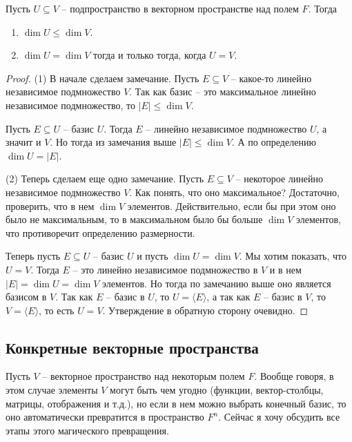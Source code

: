 \begin{claim}
\label{claim::DimSub}
Пусть $U\subseteq V$ -- подпространство в векторном пространстве над полем $F$.
Тогда
\begin{enumerate}
\item $\dim U \leqslant \dim V$.

\item $\dim U = \dim V$ тогда и только тогда, когда $U = V$.
\end{enumerate}
\end{claim}
\begin{proof}
(1) В начале сделаем замечание.
Пусть $E\subseteq V$ -- какое-то линейно независимое подмножество $V$.
Так как базис -- это максимальное линейно независимое подмножество, то $|E|\leqslant \dim V$.

Пусть $E\subseteq U$ -- базис $U$.
Тогда $E$ -- линейно независимое подмножество $U$, а значит и $V$.
Но тогда из замечания выше $|E|\leqslant \dim V$.
А по определению $\dim U = |E|$.

 (2) Теперь сделаем еще одно замечание.
 Пусть $E\subseteq V$ -- некоторое линейно независимое подмножество $V$.
 Как понять, что оно максимальное?
Достаточно, проверить, что в нем $\dim V$ элементов.
Действительно, если бы при этом оно было не максимальным, то в максимальном было бы больше $\dim V$ элементов, что противоречит определению размерности.
 
Теперь пусть $E\subseteq U$ -- базис $U$ и пусть $\dim U = \dim V$.
Мы хотим показать, что $ U = V$.
Тогда $E$ -- это линейно независимое подмножество в $V$ и в нем $|E| = \dim U = \dim V$ элементов.
Но тогда по замечанию выше оно является базисом в $V$.
Так как $E$ -- базис в $U$, то $U = \langle E \rangle$, а так как $E$ -- базис в $V$, то $V = \langle E \rangle$, то есть $U= V$.
Утверждение в обратную сторону очевидно.
\end{proof}

\subsection{Конкретные векторные пространства}
\label{subsection::FnSpace}

Пусть $V$ -- векторное пространство над некоторым полем $F$.
Вообще говоря, в этом случае элементы $V$ могут быть чем угодно (функции, вектор-столбцы, матрицы, отображения и т.д.), но если в нем можно выбрать конечный базис, то оно автоматически превратится в пространство $F^n$.
Сейчас я хочу обсудить все этапы этого магического превращения.

